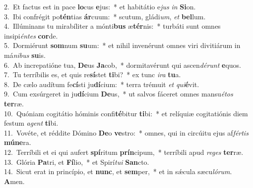 {2.~}Et factus est in pace \textbf{lo}cus \textbf{e}jus:~* et habitátio e\textit{jus} \textit{in} \textbf{Si}on.\\
{3.~}Ibi confrégit po\textbf{tén}tias \textbf{ár}cuum:~* scutum, gládi\textit{um}, \textit{et} \textbf{bel}lum.\\
{4.~}Illúminans tu mirabíliter a mónti\textbf{bus} æ\textbf{tér}nis:~* turbáti sunt omnes insipi\textit{én}\textit{tes} \textbf{cor}de.\\
{5.~}Dormiérunt \textbf{som}num \textbf{su}um:~* et nihil invenérunt omnes viri divitiárum in má\textit{ni}\textit{bus} \textbf{su}is.\\
{6.~}Ab increpatióne tua, \textbf{De}us \textbf{Ja}cob,~* dormitavérunt qui ascen\textit{dé}\textit{runt} \textbf{e}quos.\\
{7.~}Tu terríbilis es, et quis re\textbf{sí}stet \textbf{ti}bi?~* ex tunc \textit{i}\textit{ra} \textbf{tu}a.\\
{8.~}De cælo audítum fe\textbf{cí}sti ju\textbf{dí}cium:~* terra trémuit \textit{et} \textit{qui}\textbf{é}vit.\\
{9.~}Cum exsúrgeret in ju\textbf{dí}cium \textbf{De}us,~* ut salvos fáceret omnes mansu\textit{é}\textit{tos} \textbf{ter}ræ.\\
{10.~}Quóniam cogitátio hóminis confi\textbf{té}bitur \textbf{ti}bi:~* et relíquiæ cogitatiónis diem festum \textit{a}\textit{gent} \textbf{ti}bi.\\
{11.~}Vovéte, et réddite Dómino \textbf{De}o \textbf{ve}stro:~* omnes, qui in circúitu ejus af\textit{fér}\textit{tis} \textbf{mú}\textbf{ne}ra.\\
{12.~}Terríbili et ei qui aufert \textbf{spí}ritum \textbf{prín}cipum,~* terríbili apud \textit{re}\textit{ges} \textbf{ter}ræ.\\
{13.~}Glória \textbf{Pa}tri, et \textbf{Fí}lio,~* et Spirí\textit{tu}\textit{i} \textbf{San}cto.\\
{14.~}Sicut erat in princípio, et \textbf{nunc}, et \textbf{sem}per,~* et in sǽcula sæcu\textit{ló}\textit{rum}. \textbf{A}men.\\

